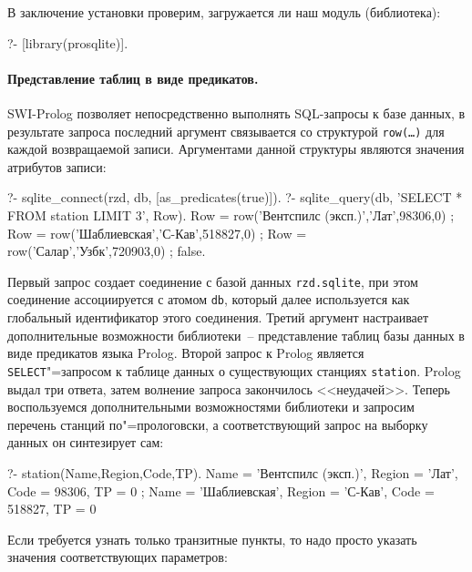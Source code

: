 \documentclass[a4paper,14pt, openany, twoside, final]{extbook} %
\begin{document}
В заключение установки проверим, загружается ли наш модуль (библиотека):

\begin{proexp}
?- [library(prosqlite)].
\end{proexp}
\pagebreak

\paragraph{Представление таблиц в виде предикатов.}  SWI-Prolog позволяет непосредственно выполнять SQL-запросы к базе данных, в результате запроса последний аргумент связывается со структурой \texttt{row(\ldots)} для каждой возвращаемой записи.  Аргументами данной структуры являются значения атрибутов записи:

\begin{proexp}
?- sqlite_connect(rzd, db, [as_predicates(true)]).
?- sqlite_query(db,
        'SELECT * FROM station LIMIT 3', Row).
Row = row('Вентспилс (эксп.)','Лат',98306,0) ;
Row = row('Шаблиевская','С-Кав',518827,0) ;
Row = row('Салар','Узбк',720903,0) ;
false.
\end{proexp}

\noindent{}Первый запрос создает соединение с базой данных \texttt{rzd.sqlite}, при этом соединение ассоциируется с атомом \texttt{db}, который далее используется как глобальный идентификатор этого соединения.  Третий аргумент настраивает дополнительные возможности библиотеки~--  представление таблиц базы данных в виде предикатов языка Prolog.  Второй запрос к Prolog является \foreignlanguage{english}{\texttt{SELECT}}"=запросом к таблице данных о существующих станциях \texttt{station}.  Prolog выдал три ответа, затем волнение запроса закончилось <<неудачей>>.  Теперь воспользуемся дополнительными возможностями библиотеки и запросим перечень станций по"=прологовски, а соответствующий запрос на выборку данных он синтезирует сам:

\begin{proexp}
?- station(Name,Region,Code,TP).
Name = 'Вентспилс (эксп.)',
Region = 'Лат',        %
Code = 98306,          %
TP = 0 ;               %
Name = 'Шаблиевская',  %
Region = 'С-Кав',
Code = 518827,
TP = 0
\end{proexp}


\noindent{}Если требуется узнать только транзитные пункты, то надо просто указать значения соответствующих параметров:
\end{document}
